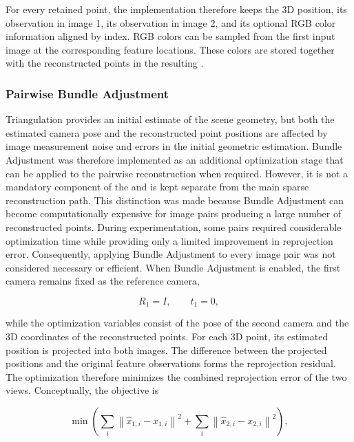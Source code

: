 For every retained point, the implementation therefore keeps the 3D
position, its observation in image 1, its observation in image 2, and its
optional RGB color information aligned by index.
RGB colors can be sampled from the first input image at the corresponding
feature locations. These colors are stored together with the reconstructed
points in the resulting .

\subsubsection{Pairwise Bundle Adjustment}

Triangulation provides an initial estimate of the scene geometry, but both
the estimated camera pose and the reconstructed point positions are affected
by image measurement noise and errors in the initial geometric estimation.
Bundle Adjustment was therefore implemented as an additional optimization
stage that can be applied to the pairwise reconstruction when required.
However, it is not a mandatory component of the  and is
kept separate from the main sparse reconstruction path.
This distinction was made because Bundle Adjustment can become
computationally expensive for image pairs producing a large number of
reconstructed points. During experimentation, some pairs required
considerable optimization time while providing only a limited improvement in
reprojection error. Consequently, applying Bundle Adjustment to every image
pair was not considered necessary or efficient.
When Bundle Adjustment is enabled, the first camera remains fixed as the
reference camera,

\begin{equation}
R_1 = I,
\qquad
t_1 = 0,
\end{equation}

while the optimization variables consist of the pose of the second camera
and the 3D coordinates of the reconstructed points.
For each 3D point, its estimated position is projected into both images.
The difference between the projected positions and the original feature
observations forms the reprojection residual.
The optimization therefore minimizes the combined reprojection error of the
two views. Conceptually, the objective is

\begin{equation}
\min
\left(
\sum_i
\left\|
\hat{x}_{1,i} - x_{1,i}
\right\|^2
+
\sum_i
\left\|
\hat{x}_{2,i} - x_{2,i}
\right\|^2
\right),
\end{equation}

